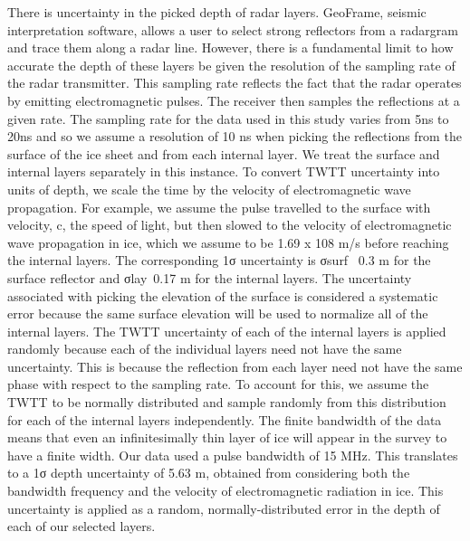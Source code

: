 \documentclass[draft,jgrga]{agutex}
\begin{document}

There is uncertainty in the picked depth of radar layers.  GeoFrame, seismic interpretation software, allows a user to select strong reflectors from a radargram and trace them along a radar line. However, there is a fundamental limit to how accurate the depth of these layers be given the resolution of the sampling rate of the radar transmitter. This sampling rate reflects the fact that the radar operates by emitting electromagnetic pulses. The receiver then samples the reflections at a given rate. The sampling rate for the data used in this study varies from 5ns to 20ns and so we assume a resolution of 10 ns when picking the reflections from the surface of the ice sheet and from each internal layer. We treat the surface and internal layers separately in this instance. 
	To convert TWTT uncertainty into units of depth, we scale the time by the velocity of electromagnetic wave propagation. For example, we assume the pulse travelled to the surface with velocity, c, the speed of light, but then slowed to the velocity of electromagnetic wave propagation in ice, which we assume to be 1.69 x 108 m/s before reaching the internal layers. The corresponding 1σ uncertainty is σsurf ~0.3 m for the surface reflector and σlay~0.17 m for the internal layers.  
The uncertainty associated with picking the elevation of the surface is considered a systematic error because the same surface elevation will be used to normalize all of the internal layers. The TWTT uncertainty of each of the internal layers is applied randomly because each of the individual layers need not have the same uncertainty. This is because the reflection from each layer need not have the same phase with respect to the sampling rate. To account for this, we assume the TWTT to be normally distributed and sample randomly from this distribution for each of the internal layers independently.
	The finite bandwidth of the data means that even an infinitesimally thin layer of ice will appear in the survey to have a finite width. Our data used a pulse bandwidth of 15 MHz. This translates to a 1σ depth uncertainty of 5.63 m, obtained from considering both the bandwidth frequency and the velocity of electromagnetic radiation in ice. This uncertainty is applied as a random, normally-distributed error in the depth of each of our selected layers. 
\end{document}
